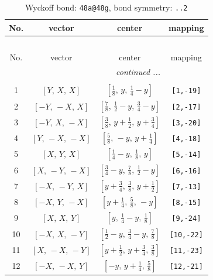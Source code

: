 \documentclass[fleqn,8pt]{jsarticle}
\begin{document}
\begin{longtable}{cccc}
\caption{Wyckoff bond: {\tt 48a@48g}, bond symmetry: {\tt ..2}}
 \\
 \hline \hline
No. & vector & center & mapping \\ \hline \endfirsthead

\multicolumn{3}{l}{\tablename\ \thetable{}} \\
 \hline \hline
No. & vector & center & mapping \\ \hline \endhead

 \hline \hline
\multicolumn{3}{r}{\footnotesize\it continued ...} \\ \endfoot

 \hline \hline
\multicolumn{3}{r}{} \\ \endlastfoot

1 & $\left[ Y,\, X,\, X \right]$ & $\left[ \frac{1}{8},\, y,\, \frac{1}{4} - y \right]$ & {\tt [1,-19]} \\ \hline
2 & $\left[ - Y,\, - X,\, X \right]$ & $\left[ \frac{7}{8},\, \frac{1}{2} - y,\, \frac{3}{4} - y \right]$ & {\tt [2,-17]} \\ \hline
3 & $\left[ - Y,\, X,\, - X \right]$ & $\left[ \frac{3}{8},\, y + \frac{1}{2},\, y + \frac{3}{4} \right]$ & {\tt [3,-20]} \\ \hline
4 & $\left[ Y,\, - X,\, - X \right]$ & $\left[ \frac{5}{8},\, - y,\, y + \frac{1}{4} \right]$ & {\tt [4,-18]} \\ \hline
5 & $\left[ X,\, Y,\, X \right]$ & $\left[ \frac{1}{4} - y,\, \frac{1}{8},\, y \right]$ & {\tt [5,-14]} \\ \hline
6 & $\left[ X,\, - Y,\, - X \right]$ & $\left[ \frac{3}{4} - y,\, \frac{7}{8},\, \frac{1}{2} - y \right]$ & {\tt [6,-16]} \\ \hline
7 & $\left[ - X,\, - Y,\, X \right]$ & $\left[ y + \frac{3}{4},\, \frac{3}{8},\, y + \frac{1}{2} \right]$ & {\tt [7,-13]} \\ \hline
8 & $\left[ - X,\, Y,\, - X \right]$ & $\left[ y + \frac{1}{4},\, \frac{5}{8},\, - y \right]$ & {\tt [8,-15]} \\ \hline
9 & $\left[ X,\, X,\, Y \right]$ & $\left[ y,\, \frac{1}{4} - y,\, \frac{1}{8} \right]$ & {\tt [9,-24]} \\ \hline
10 & $\left[ - X,\, X,\, - Y \right]$ & $\left[ \frac{1}{2} - y,\, \frac{3}{4} - y,\, \frac{7}{8} \right]$ & {\tt [10,-22]} \\ \hline
11 & $\left[ X,\, - X,\, - Y \right]$ & $\left[ y + \frac{1}{2},\, y + \frac{3}{4},\, \frac{3}{8} \right]$ & {\tt [11,-23]} \\ \hline
12 & $\left[ - X,\, - X,\, Y \right]$ & $\left[ - y,\, y + \frac{1}{4},\, \frac{5}{8} \right]$ & {\tt [12,-21]} \\
\end{longtable}
\end{document}
